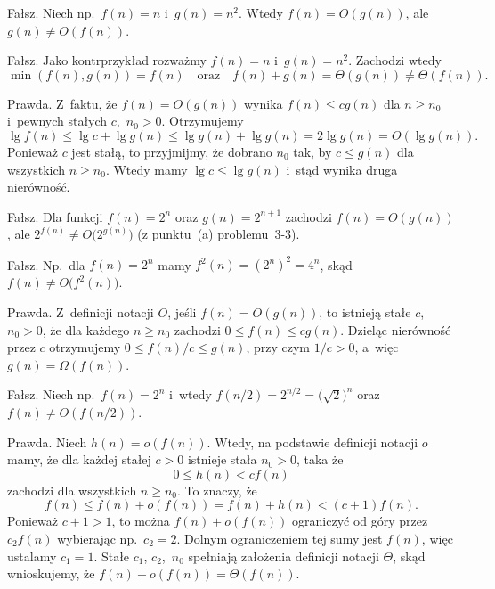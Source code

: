 
\subproblem %
Fałsz. Niech np.\ $f(n)=n$ i~$g(n)=n^2$. Wtedy $f(n)=O(g(n))$, ale $g(n)\ne O(f(n))$.

\subproblem %
Fałsz. Jako kontrprzykład rozważmy $f(n)=n$ i~$g(n)=n^2$. Zachodzi wtedy
\[
	\min(f(n),g(n)) = f(n) \quad\text{oraz}\quad f(n)+g(n) = \Theta(g(n)) \ne \Theta(f(n)).
\]

\subproblem %
Prawda. Z~faktu, że $f(n)=O(g(n))$ wynika $f(n)\le cg(n)$ dla $n\ge n_0$ i~pewnych stałych $c$,~$n_0>0$. Otrzymujemy
\[
	\lg f(n) \le \lg c+\lg g(n) \le \lg g(n)+\lg g(n) = 2\lg g(n) = O(\lg g(n)).
\]
Ponieważ $c$ jest stałą, to przyjmijmy, że dobrano $n_0$ tak, by $c\le g(n)$ dla wszystkich $n\ge n_0$. Wtedy mamy $\lg c\le\lg g(n)$ i~stąd wynika druga nierówność.

\subproblem %
Fałsz. Dla funkcji $f(n)=2^n$ oraz $g(n)=2^{n+1}$ zachodzi $f(n)=O(g(n))$, ale $2^{f(n)}\ne O\bigl(2^{g(n)}\bigr)$ (z punktu~(a) problemu~3-3).

\subproblem %
Fałsz. Np.\ dla $f(n)=2^n$ mamy $f^2(n)=(2^n)^2=4^n$, skąd $f(n)\ne O\bigl(f^2(n)\bigr)$.

\subproblem %
Prawda. Z~definicji notacji $O$, jeśli $f(n)=O(g(n))$, to istnieją stałe $c$,~$n_0>0$, że dla każdego $n\ge n_0$ zachodzi $0\le f(n)\le cg(n)$. Dzieląc nierówność przez $c$ otrzymujemy $0\le f(n)/c\le g(n)$, przy czym $1/c>0$, a~więc $g(n)=\Omega(f(n))$.

\subproblem %
Fałsz. Niech np.\ $f(n)=2^n$ i~wtedy $f(n/2)=2^{n/2}={\bigl(\!\sqrt{2}\bigr)}^n$ oraz $f(n)\ne O(f(n/2))$.

\subproblem %
Prawda. Niech $h(n)=o(f(n))$. Wtedy, na podstawie definicji notacji $o$ mamy, że dla każdej stałej $c>0$ istnieje stała $n_0>0$, taka że
\[
	0 \le h(n) < cf(n)
\]
zachodzi dla wszystkich $n\ge n_0$. To znaczy, że
\[
	f(n) \le f(n)+o(f(n)) = f(n)+h(n) < (c+1)f(n).
\]
Ponieważ $c+1>1$, to można $f(n)+o(f(n))$ ograniczyć od góry przez $c_2f(n)$ wybierając np.\ $c_2=2$. Dolnym ograniczeniem tej sumy jest $f(n)$, więc ustalamy $c_1=1$. Stałe $c_1$, $c_2$,~$n_0$ spełniają założenia definicji notacji $\Theta$, skąd wnioskujemy, że $f(n)+o(f(n))=\Theta(f(n))$.

\bigskip
{}

